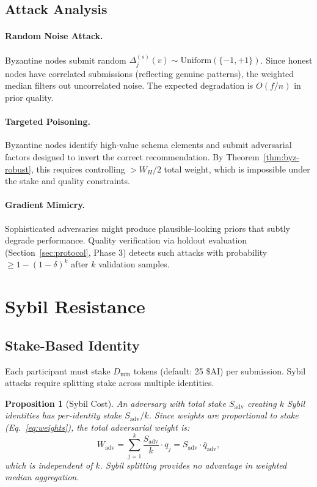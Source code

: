 \documentclass[11pt]{article}
\newtheorem{proposition}[theorem]{Proposition}
\begin{document}
\subsection{Attack Analysis}

\paragraph{Random Noise Attack.}
Byzantine nodes submit random $\Delta_j^{(s)}(v) \sim \text{Uniform}(\{-1, +1\})$.
Since honest nodes have correlated submissions (reflecting genuine patterns),
the weighted median filters out uncorrelated noise. The expected degradation is
$O(f/n)$ in prior quality.

\paragraph{Targeted Poisoning.}
Byzantine nodes identify high-value schema elements and submit adversarial
factors designed to invert the correct recommendation. By
Theorem~\ref{thm:byz-robust}, this requires controlling $> W_H / 2$ total
weight, which is impossible under the stake and quality constraints.

\paragraph{Gradient Mimicry.}
Sophisticated adversaries might produce plausible-looking priors that subtly
degrade performance. Quality verification via holdout evaluation
(Section~\ref{sec:protocol}, Phase 3) detects such attacks with probability
$\geq 1 - (1-\delta)^k$ after $k$ validation samples.

\section{Sybil Resistance}
\label{sec:sybil}

\subsection{Stake-Based Identity}

Each participant must stake $D_{\min}$ tokens (default: 25 \$AI) per submission.
Sybil attacks require splitting stake across multiple identities.

\begin{proposition}[Sybil Cost]
\label{prop:sybil-cost}
An adversary with total stake $S_{\text{adv}}$ creating $k$ Sybil identities
has per-identity stake $S_{\text{adv}} / k$. Since weights are proportional to
stake (Eq.~\ref{eq:weights}), the total adversarial weight is:
\begin{equation}
    W_{\text{adv}} = \sum_{j=1}^k \frac{S_{\text{adv}}}{k} \cdot q_j = S_{\text{adv}} \cdot \bar{q}_{\text{adv}},
\end{equation}
which is independent of $k$. Sybil splitting provides no advantage in weighted
median aggregation.
\end{proposition}
\end{document}
